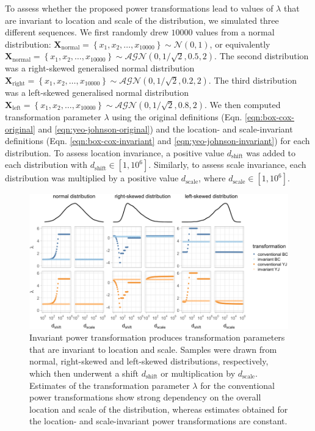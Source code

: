 \documentclass[
  a4paper,
]{article}
\begin{document}
To assess whether the proposed power transformations lead to values of
\(\lambda\) that are invariant to location and scale of the
distribution, we simulated three different sequences. We first randomly
drew \(10000\) values from a normal distribution:
\(\mathbf{X}_{\text{normal}} = \left\{x_1, x_2, \ldots, x_{10000} \right\} \sim \mathcal{N}\left(0, 1\right)\),
or equivalently
\(\mathbf{X}_{\text{normal}} = \left\{x_1, x_2, \ldots, x_{10000} \right\} \sim \mathcal{AGN}\left(0, 1/\sqrt{2}, 0.5, 2\right)\).
The second distribution was a right-skewed generalised normal
distribution
\(\mathbf{X}_{\text{right}} = \left\{x_1, x_2, \ldots, x_{10000} \right\} \sim \mathcal{AGN}\left(0, 1/\sqrt{2}, 0.2, 2\right)\).
The third distribution was a left-skewed generalised normal distribution
\(\mathbf{X}_{\text{left}} = \left\{x_1, x_2, \ldots, x_{10000} \right\} \sim \mathcal{AGN}\left(0, 1/\sqrt{2}, 0.8, 2\right)\).
We then computed transformation parameter \(\lambda\) using the original
definitions (Eqn. \ref{eqn:box-cox-original} and
\ref{eqn:yeo-johnson-original}) and the location- and scale-invariant
definitions (Eqn. \ref{eqn:box-cox-invariant} and
\ref{eqn:yeo-johnson-invariant}) for each distribution. To assess
location invariance, a positive value \(d_{\text{shift}}\) was added to
each distribution with \(d_{\text{shift}} \in [1, 10^6]\). Similarly, to
assess scale invariance, each distribution was multiplied by a positive
value \(d_{\text{scale}}\), where \(d_{\text{scale}} \in [1, 10^6]\).

\begin{figure}

{\centering \includegraphics{manuscript_files/figure-latex/shifted-distributions-1} 

}

\caption{Invariant power transformation produces transformation parameters that are invariant to location and scale. Samples were drawn from normal, right-skewed and left-skewed distributions, respectively, which then underwent a shift $d_{\text{shift}}$ or multiplication by $d_{\text{scale}}$. Estimates of the transformation parameter $\lambda$ for the conventional power transformations show strong dependency on the overall location and scale of the distribution, whereas estimates obtained for the location- and scale-invariant power transformations are constant.}\label{fig:shifted-distributions}
\end{figure}
\end{document}
